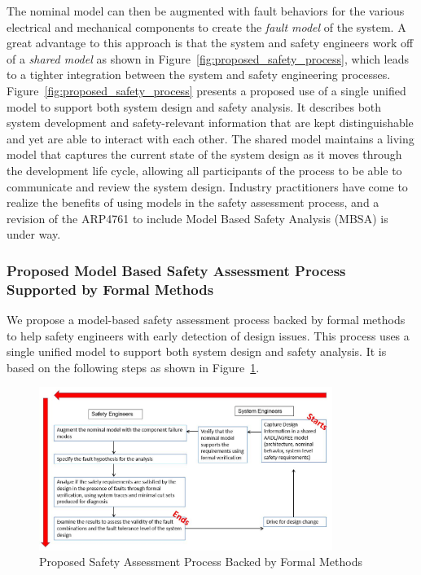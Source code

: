 The nominal model can then be augmented with fault behaviors for the various electrical and mechanical components to create the \emph{fault model} of the system. A great advantage to this approach is that the system and safety engineers work off of a \emph{shared model} as shown in Figure~\ref{fig:proposed_safety_process}, which leads to a tighter integration between the system and safety engineering processes. Figure~\ref{fig:proposed_safety_process} presents a proposed use of a single unified model to support both system design and safety analysis. It describes both system development and safety-relevant information that are kept distinguishable and yet are able to interact with each other. The shared model maintains a living model that captures the current state of the system design as it moves through the development life cycle, allowing all participants of the process to be able to communicate and review the system design. Industry practitioners have come to realize the benefits of using models in the safety assessment process, and a revision of the ARP4761 to include Model Based Safety Analysis (MBSA) is under way. 

\subsubsection{Proposed Model Based Safety Assessment Process Supported by Formal Methods}
We propose a model-based safety assessment process backed by formal methods to help safety engineers with early detection of design issues.  This process uses a single unified model to support both system design and safety analysis. It is based on the following steps as shown in Figure~\ref{fig:updated_safety_process}.

\begin{figure}[t!]
	\centering
	\includegraphics[width=0.85\textwidth]{images/process4.jpg}
	\caption{Proposed Safety Assessment Process Backed by Formal Methods}
	\label{fig:updated_safety_process}
\end{figure}

